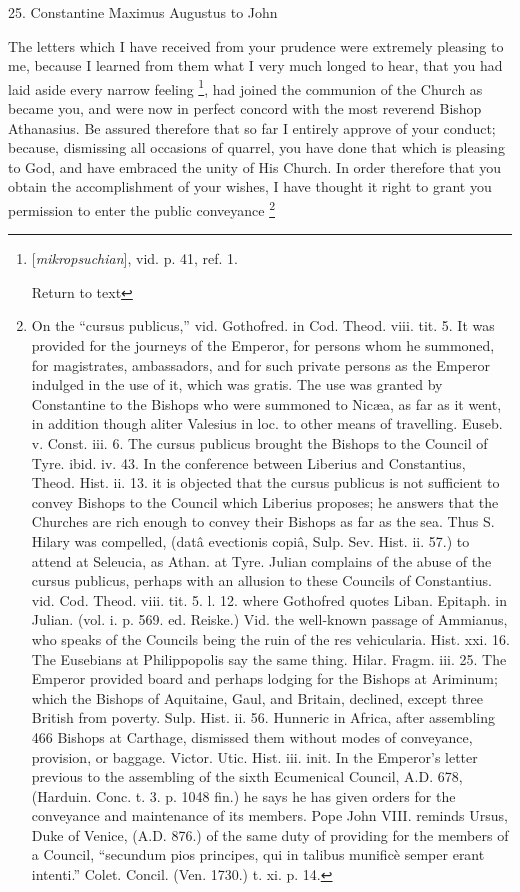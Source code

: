 25. Constantine Maximus Augustus to John

The letters which I have received from your
prudence were extremely pleasing to me, because I learned from them
what I very much longed to hear, that you had laid aside every narrow
feeling \footnote{[\emph{mikropsuchian}], vid. p. 41, ref. 1.

Return to text}, had joined
the communion of the Church as became you, and were now in perfect
concord with the most reverend Bishop Athanasius. Be assured therefore
that so far I entirely approve of your conduct; because, dismissing
all occasions of quarrel, you have done that which is pleasing
to God, and have embraced the unity of His Church. In order therefore
that you obtain the accomplishment of your wishes, I have thought it
right to grant you permission to enter the public conveyance \footnote{On the “cursus publicus,” vid. Gothofred. in Cod. Theod. viii.
tit. 5. It was provided for the journeys of the Emperor, for persons
whom he summoned, for magistrates, ambassadors, and for such private
persons as the Emperor indulged in the use of it, which was gratis.
The use was granted by Constantine to the Bishops who were summoned to
Nicæa, as far as it went, in addition though aliter Valesius in loc.
to other means of travelling. Euseb. v. Const. iii. 6. The cursus
publicus brought the Bishops to the Council of Tyre. ibid. iv. 43. In
the conference between Liberius and Constantius, Theod. Hist. ii. 13.
it is objected that the cursus publicus is not sufficient to convey
Bishops to the Council which Liberius proposes; he answers that the
Churches are rich enough to convey their Bishops as far as the sea.
Thus S. Hilary was compelled, (datâ evectionis copiâ, Sulp. Sev.
Hist. ii. 57.) to attend at Seleucia, as Athan. at Tyre. Julian
complains of the abuse of the cursus publicus, perhaps with an
allusion to these Councils of Constantius. vid. Cod. Theod. viii. tit.
5. l. 12. where Gothofred quotes Liban. Epitaph. in Julian. (vol. i.
p. 569. ed. Reiske.) Vid. the well-known passage of Ammianus, who
speaks of the Councils being the ruin of the res vehicularia. Hist.
xxi. 16. The Eusebians at Philippopolis say the same thing. Hilar.
Fragm. iii. 25. The Emperor provided board and perhaps lodging for the
Bishops at Ariminum; which the Bishops of Aquitaine, Gaul, and
Britain, declined, except three British from poverty. Sulp. Hist. ii.
56. Hunneric in Africa, after assembling 466 Bishops at Carthage,
dismissed them without modes of conveyance, provision, or baggage.
Victor. Utic. Hist. iii. init. In the Emperor’s letter previous to
the assembling of the sixth Ecumenical Council, A.D. 678, (Harduin. Conc. t. 3. p. 1048 fin.)
he says he has given orders for the conveyance and maintenance of its
members. Pope John VIII. reminds Ursus, Duke of Venice, (A.D. 876.) of the same duty of providing for
the members of a Council, “secundum pios principes, qui in talibus
munificè semper erant intenti.” Colet. Concil. (Ven. 1730.) t. xi.
p. 14.

}
